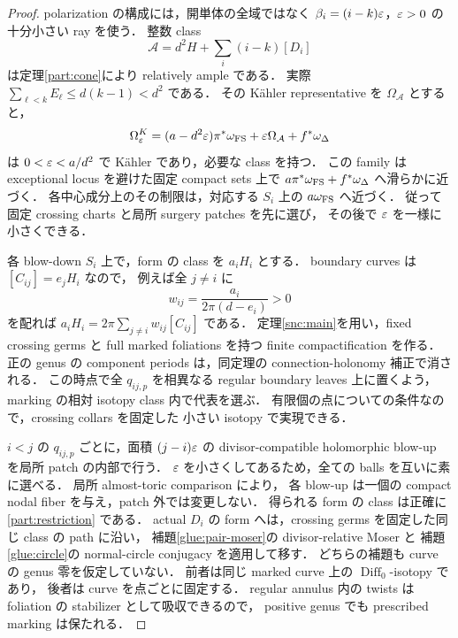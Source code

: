 \begin{proof}
polarization の構成には，開単体の全域ではなく
$\beta_i=(i-k)\varepsilon$，$\varepsilon>0$ の十分小さい ray を使う．
整数 class
\[
 \mathcal A=d^2H+\sum_i(i-k)[D_i]
\]
は定理\ref{part:cone}により relatively ample である．
実際 $\sum_{\ell<k}E_\ell\leq d(k-1)<d^2$ である．
その Kähler representative を $\Omega_{\mathcal A}$ とすると，
\[
 \Omega_\varepsilon^K=(a-d^2\varepsilon)\pi^*\omega_{\rm FS}
              +\varepsilon\Omega_{\mathcal A}+f^*\omega_\Delta
\]
は $0<\varepsilon<a/d^2$ で Kähler であり，必要な class を持つ．
この family は exceptional locus を避けた固定 compact sets 上で
$a\pi^*\omega_{\rm FS}+f^*\omega_\Delta$ へ滑らかに近づく．
各中心成分上のその制限は，対応する $S_i$ 上の $a\omega_{\rm FS}$ へ近づく．
従って固定 crossing charts と局所 surgery patches を先に選び，
その後で $\varepsilon$ を一様に小さくできる．

各 blow-down $S_i$ 上で，form の class を $a_iH_i$ とする．
boundary curves は $[C_{ij}]=e_jH_i$ なので，
例えば全 $j\ne i$ に
\[
 w_{ij}=\frac{a_i}{2\pi(d-e_i)}>0
\]
を配れば $a_iH_i=2\pi\sum_{j\ne i}w_{ij}[C_{ij}]$ である．
定理\ref{snc:main}を用い，fixed crossing germs と full marked foliations を持つ
finite compactification を作る．
正の genus の component periods は，同定理の connection-holonomy 補正で消される．
この時点で全 $q_{ij,p}$ を相異なる regular boundary leaves 上に置くよう，
marking の相対 isotopy class 内で代表を選ぶ．
有限個の点についての条件なので，crossing collars を固定した
小さい isotopy で実現できる．

$i<j$ の $q_{ij,p}$ ごとに，面積 $(j-i)\varepsilon$ の divisor-compatible holomorphic
blow-up を局所 patch の内部で行う．
$\varepsilon$ を小さくしてあるため，全ての balls を互いに素に選べる．
局所 almost-toric comparison \cite[Theorem 1.1]{CGblowup} により，
各 blow-up は一個の compact nodal fiber を与え，patch 外では変更しない．
得られる form の class は正確に \eqref{part:restriction} である．
actual $D_i$ の form へは，crossing germs を固定した同じ class の path に沿い，
補題\ref{glue:pair-moser}の divisor-relative Moser と
補題\ref{glue:circle}の normal-circle conjugacy を適用して移す．
どちらの補題も curve の genus 零を仮定していない．
前者は同じ marked curve 上の $\operatorname{Diff}_0$-isotopy であり，
後者は curve を点ごとに固定する．
regular annulus 内の twists は foliation の stabilizer として吸収できるので，
positive genus でも prescribed marking は保たれる．


\end{proof}
